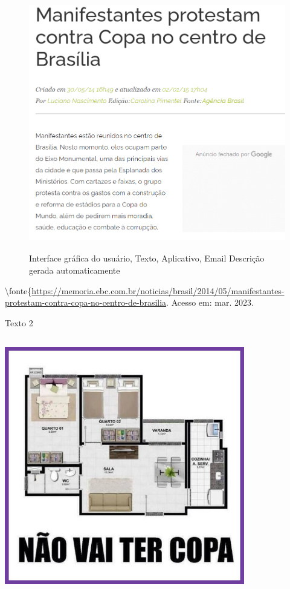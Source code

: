 \begin{figure}
\centering
\includegraphics[width=4.80833in,height=4.39331in]{./imgSAEB_6_POR/media/image47.png}
\caption{Interface gráfica do usuário, Texto, Aplicativo, Email
Descrição gerada automaticamente}
\end{figure}

\textbackslash fonte\{\url{https://memoria.ebc.com.br/noticias/brasil/2014/05/manifestantes-protestam-contra-copa-no-centro-de-brasilia}.
Acesso em: mar. 2023.

Texto 2

\hypertarget{linha-do-tempo-descriuxe7uxe3o-gerada-automaticamente-com-confianuxe7a-muxe9dia}{%
\subsection{\texorpdfstring{\protect\includegraphics[width=4.125in,height=4.08668in]{./imgSAEB_6_POR/media/image48.jpeg}}{Linha do tempo Descrição gerada automaticamente com confiança média}}\label{linha-do-tempo-descriuxe7uxe3o-gerada-automaticamente-com-confianuxe7a-muxe9dia}}


